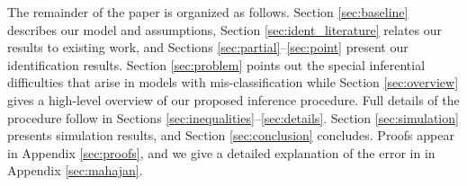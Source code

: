 The remainder of the paper is organized as follows.
Section \ref{sec:baseline} describes our model and assumptions, Section \ref{sec:ident_literature} relates our results to existing work, and Sections \ref{sec:partial}--\ref{sec:point} present our identification results.
Section \ref{sec:problem} points out the special inferential difficulties that arise in models with mis-classification while Section \ref{sec:overview} gives a high-level overview of our proposed inference procedure.
Full details of the procedure follow in Sections \ref{sec:inequalities}--\ref{sec:details}.
Section \ref{sec:simulation} presents simulation results, and Section \ref{sec:conclusion} concludes.
Proofs appear in Appendix \ref{sec:proofs}, and we give a detailed explanation of the error in \cite{Mahajan} in Appendix \ref{sec:mahajan}.


